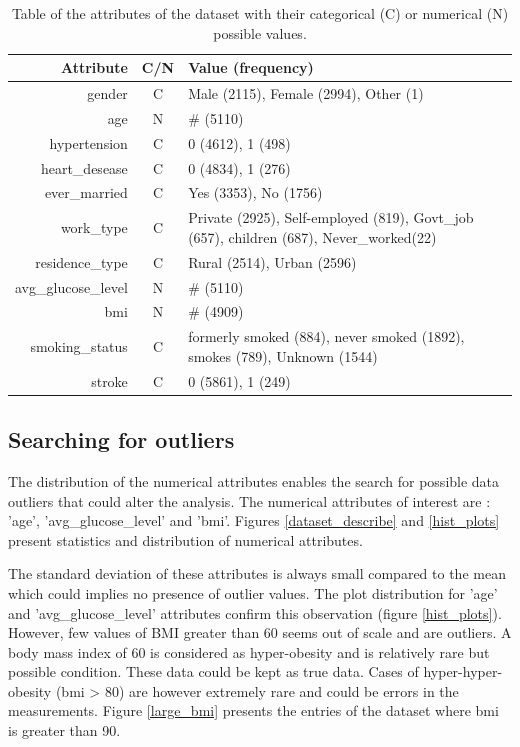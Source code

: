 \begin{table}[H]\begin{tabular}{rcm{11cm}}
\textbf{Attribute} & \textbf{C/N} & \textbf{Value (frequency)}\\\hline\hline
gender             & C & Male (2115), Female (2994), Other (1)\\
age                & N & \# (5110)\\
hypertension       & C & 0 (4612), 1 (498)\\
heart\_desease     & C & 0 (4834), 1 (276)\\
ever\_married      & C & Yes (3353), No (1756)\\
work\_type         & C & Private (2925), Self-employed (819), Govt\_job (657), children (687), Never\_worked(22)\\
residence\_type    & C & Rural (2514), Urban (2596) \\
avg\_glucose\_level& N & \# (5110)\\
bmi                & N & \# (4909)\\
smoking\_status    & C & formerly smoked (884), never smoked (1892), smokes (789), Unknown (1544)\\
stroke             & C & 0 (5861), 1 (249)\\
\end{tabular}
\caption{Table of the attributes of the dataset with their categorical (C) or numerical (N) possible values.}
\label{table_attributes_2}
\end{table}

\subsection{Searching for outliers}
The distribution of the numerical attributes enables the search for possible data outliers that could 
alter the analysis. The numerical attributes of interest are : 'age', 'avg\_glucose\_level' and 'bmi'. 
Figures \ref{dataset_describe} and \ref{hist_plots} present statistics and distribution of numerical 
attributes. 

The standard deviation of these attributes is always small compared to the mean which could implies no 
presence of outlier values. The plot distribution for 'age' and 'avg\_glucose\_level' attributes confirm 
this observation (figure \ref{hist_plots}). However, few values of BMI greater than 60 seems out 
of scale and are outliers. A body mass index of 60 is considered as hyper-obesity and is relatively 
rare but possible condition. These data could be kept as true data. Cases of hyper-hyper-obesity 
(bmi > 80) are however extremely rare and could be errors in the measurements. Figure \ref{large_bmi} 
presents the entries of the dataset where bmi is greater than 90.

